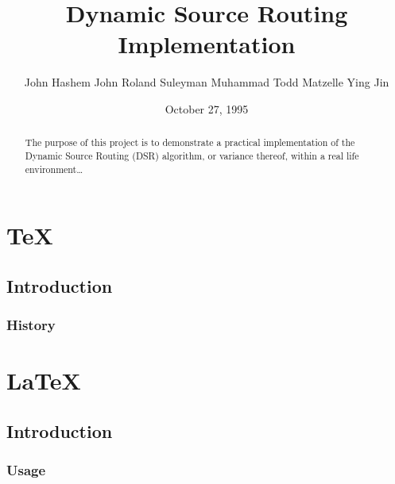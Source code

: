 \documentclass[]{report}   %
\begin{document}
\title{Dynamic Source Routing Implementation}   %
\author{John Hashem John Roland Suleyman Muhammad Todd Matzelle Ying Jin}         %
\date{October 27, 1995}    %
\maketitle

\begin{abstract}
The purpose of this project is to demonstrate a practical implementation of the Dynamic Source Routing (DSR) algorithm, or variance thereof, within a real life environment…
\end{abstract}

\chapter{\TeX}             %
\section{Introduction}     %
\subsection{History}       %

\chapter{\LaTeX}           %
\section{Introduction}     %
\subsection{Usage}         %

\begin{thebibliography}{9}
\end{thebibliography}
\end{document}
